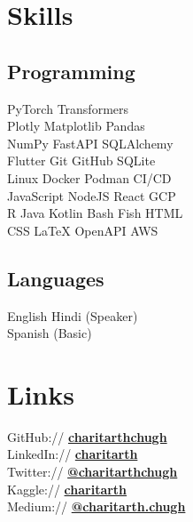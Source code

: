\documentclass[]{resume-template}
\begin{document}
\begin{minipage}[t]{0.33\textwidth}
        \section{Skills}\label{sec:skills}

        \subsection{Programming}\label{subsec:programming}
        PyTorch \textbullet{} Transformers \textbullet{} \\
        Plotly \textbullet{} Matplotlib \textbullet{} Pandas \textbullet{}\\
        NumPy \textbullet{} FastAPI \textbullet SQLAlchemy \\ %
        Flutter \textbullet{} Git \textbullet{} GitHub \textbullet{} SQLite \textbullet{}\\
        Linux \textbullet Docker \textbullet Podman \textbullet {} CI/CD \\
        JavaScript \textbullet{} NodeJS \textbullet{} React \textbullet{} GCP\\
        R \textbullet{} Java \textbullet{} Kotlin \textbullet{} Bash \textbullet{} Fish \textbullet{} HTML \textbullet{}\\
        CSS \textbullet{} \LaTeX \textbullet{} OpenAPI \textbullet{} AWS %
        \vspace{\topsep}

        \subsection{Languages}
        English \textbullet{} Hindi (Speaker)\\
        Spanish (Basic)


        \section{Links}\label{sec:links}
        GitHub:// \href{https://github.com/charitarthchugh}{\textbf {charitarthchugh}} \\
        LinkedIn:// \href{https:///www.linkedin.com/in/charitarth}{\textbf {charitarth}} \\
        Twitter:// \href{https://twitter.com/charitarthchugh}{\textbf{@charitarthchugh}}\\
        Kaggle:// \href{https://kaggle.com/charitarth}{\textbf{charitarth}}\\
        Medium:// \href{https://medium.com/@charitarth.chugh}{\textbf{@charitarth.chugh}}\\

    \end{minipage}
\end{document}
